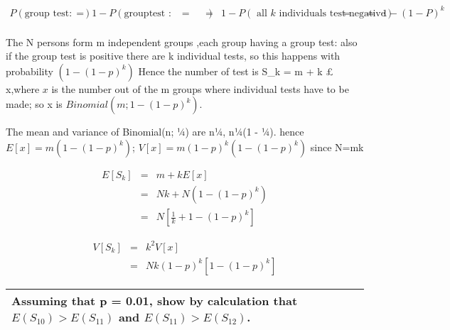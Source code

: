\documentclass[a4paper,12pt]{article}
\begin{document}
\begin{eqnarray*}
P(\mbox{group test: Positive}) &=& 1 - P(\mbox{grouptest : negative})&=&
&=& 1 - P(\mbox{ all }k \mbox{ individuals test negative})&=&
&=& 1 - (1 - P)^k\\
\end{eqnarray*}

\item The N persons form m independent groups ,each group having a group test: also
if the group test is positive there are k individual tests, so this happens with probability
$(1 - (1 - p)^k)$
Hence the number of test is S_{k} = m + k £ x,where $x$ is the number out of the m
groups where individual tests have to be made; so x is $Binomial(m; 1 - (1 - p)^k)$.

\item The mean and variance of Binomial(n; ¼) are n¼, n¼(1 - ¼). hence
$E[x] = m(1 - (1 - p)^{k})$; 
$V [x] = m(1 - p)^{k}(1 - (1 - p)^{k})
$
since N=mk

\begin{eqnarray*}
E[S_{k}] &=& m + kE[x] \\&=& N
k + N(1 - (1 - p)^{k}) 
\\&=& N[ \frac{1}{
k} + 1 - (1 - p)^{k}]
\end{eqnarray*}

\begin{eqnarray*}
V [S_{k}] &=& k^2V [x] \\&=& Nk(1 - p)^{k}[1 - (1 - p)^{k}]
\end{eqnarray*}

  \begin{table}[ht!]
     \centering
     \begin{tabular}{|p{15cm}|}
     \hline   Assuming that p = 0.01, show by calculation that $E(S_{10}) > E(S_{11})$ and $E(S_{11}) > E(S_{12})$.
\\ \hline
      \end{tabular}
    \end{table}
    
\end{document}
